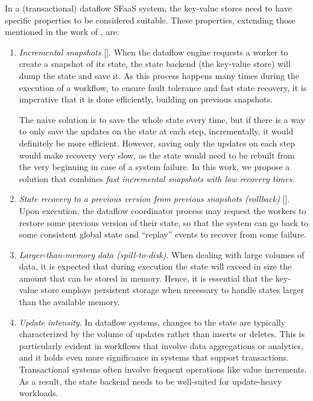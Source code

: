 In a (transactional) dataflow SFaaS system, the key-value stores need to have specific properties to be considered suitable. These properties, extending those mentioned in the work of \cite{faster}, are:

\begin{enumerate}
    \item \textit{Incremental snapshots} [\cite{state-management-apache-flink}].
    When the dataflow engine requests a worker to create a snapshot of its state, the state backend (the key-value store) will dump the state and save it. As this process happens many times during the execution of a workflow, to ensure fault tolerance and fast state recovery, it is imperative that it is done efficiently, building on previous snapshots.
    
    The naive solution is to save the whole state every time, but if there is a way to only save the updates on the state at each step, incrementally, it would definitely be more efficient. However, saving only the updates on each step would make recovery very slow, as the state would need to be rebuilt from the very beginning in case of a system failure.
    In this work, we propose a solution that combines \textit{fast incremental snapshots with low recovery times}.

    \item \textit{State recovery to a previous version from previous snapshots (rollback)} [\cite{snapshots-rollbacks,state-management-apache-flink}]. Upon execution, the dataflow coordinator process may request the workers to restore some previous version of their state, so that the system can go back to some consistent global state and ``replay'' events to recover from some failure.
    
    \item \textit{Larger-than-memory data (spill-to-disk)}.
    When dealing with large volumes of data, it is expected that during execution the state will exceed in size the amount that can be stored in memory.
    Hence, it is essential that the key-value store employs persistent storage when necessary to handle states larger than the available memory.

    \item \textit{Update intensity}.
    In dataflow systems, changes to the state are typically characterized by the volume of updates rather than inserts or deletes.
    This is particularly evident in workflows that involve data aggregations or analytics, and it holds even more significance in systems that support transactions.
    Transactional systems often involve frequent operations like value increments. As a result, the state backend needs to be well-suited for update-heavy workloads.


\end{enumerate}
